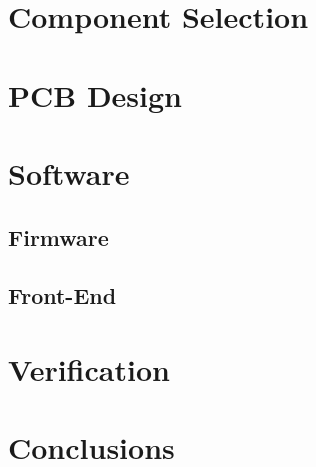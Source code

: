 \documentclass{fhnwreport/fhnwreport}
\begin{document}
\clearpage
\section{Component Selection}
\label{sec:components}



\clearpage
\section{PCB Design}
\label{sec:pcb}



\clearpage
\section{Software}
\label{sec:software}
\subsection{Firmware}
\label{subsec:firmware}

\subsection{Front-End}
\label{subsec:frontend}



\clearpage
\section{Verification}
\label{sec:verification}



\clearpage
\section{Conclusions}
\label{sec:conclusion}

\end{document}

